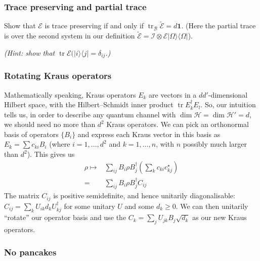 \documentclass[fleqn]{article}
\begin{document}
\hypertarget{trace-preserving-and-partial-trace}{%
\subsubsection{Trace preserving and partial trace}\label{trace-preserving-and-partial-trace}}

Show that \(\mathcal{E}\) is trace preserving if and only if \(\operatorname{tr}_\mathcal{B}\widetilde{\mathcal{E}} = d\mathbf{1}\).
(Here the partial trace is over the second system in our definition \(\widetilde{\mathcal{E}} =\mathcal{I}\otimes\mathcal{E}|\Omega\rangle\langle\Omega|\)).

\emph{(Hint: show that \(\operatorname{tr}\mathcal{E}(|i\rangle\langle j|=\delta_{ij}\).)}

\hypertarget{rotating-kraus-operators}{%
\subsubsection{Rotating Kraus operators}\label{rotating-kraus-operators}}

Mathematically speaking, Kraus operators \(E_k\) are vectors in a \(dd'\)-dimensional Hilbert space, with the Hilbert--Schmidt inner product \(\operatorname{tr}E^\dagger_k E_l\).
So, our intuition tells us, in order to describe any quantum channel with \(\dim\mathcal{H}=\dim\mathcal{H}'=d\), we should need no more than \(d^2\) Kraus operators.
We can pick an orthonormal basis of operators \(\{B_i\}\) and express each Kraus vector in this basis as \(E_k=\sum c_{ki} B_i\) (where \(i=1,\ldots,d^2\) and \(k=1,\ldots,n\), with \(n\) possibly much larger than \(d^2\)).
This gives us
\[
  \begin{aligned}
    \rho
    \longmapsto
    & \sum_{ij} B_i\rho B^\dagger_j \left(\sum _k c_{ki}c^\star_{kj}\right)
  \\=& \sum_{ij} B_i\rho B^\dagger_j  C_{ij}
  \end{aligned}
\]
The matrix \(C_{ij}\) is positive semidefinite, and hence unitarily diagonalisable: \(C_{ij}=\sum_k U_{ik} d_k U^\dagger_{kj}\) for some unitary \(U\) and some \(d_k\geqslant 0\).
We can then unitarily ``rotate'' our operator basis and use the \(C_k=\sum_j U_{jk}B_j \sqrt{d_k}\) as our new Kraus operators.

\hypertarget{no-pancakes}{%
\subsubsection{No pancakes}\label{no-pancakes}}
\end{document}
